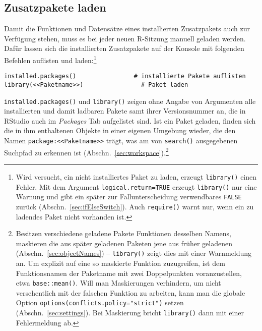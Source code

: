 \subsection{Zusatzpakete laden}
\label{sec:packages_library}

Damit die Funktionen und Datensätze eines installierten Zusatzpakets auch zur Verfügung stehen, muss es bei jeder neuen R-Sitzung manuell geladen werden. Dafür lassen sich die installierten Zusatzpakete auf der Konsole mit folgenden Befehlen auflisten und laden:\footnote{Wird versucht, ein nicht installiertes Paket zu laden, erzeugt \lstinline!library()! einen Fehler. Mit dem Argument \lstinline!logical.return=TRUE! erzeugt \lstinline!library()! nur eine Warnung und gibt ein später zur Fallunterscheidung verwendbares \lstinline!FALSE! zurück (Abschn.\ \ref{sec:ifElseSwitch}). Auch \lstinline!require()! warnt nur, wenn ein zu ladendes Paket nicht vorhanden ist.}


\begin{lstlisting}
installed.packages()                # installierte Pakete auflisten
library(<<Paketname>>)                # Paket laden
\end{lstlisting}

\lstinline!installed.packages()! und \lstinline!library()! zeigen ohne Angabe von Argumenten alle installierten und damit ladbaren Pakete samt ihrer Versionsnummer an, die in RStudio auch im \emph{Packages} Tab aufgelistet sind. Ist ein Paket geladen, finden sich die in ihm enthaltenen Objekte in einer eigenen Umgebung wieder, die den Namen \lstinline!package:<<Paketname>>! trägt, was am von \lstinline!search()! ausgegebenen Suchpfad zu erkennen ist (Abschn.\ \ref{sec:workspace}).\footnote{\label{ftn:envirFunc}Besitzen verschiedene geladene Pakete Funktionen desselben Namens, maskieren die aus später geladenen Paketen jene aus früher geladenen (Abschn.\ \ref{sec:objectNames}) -- \lstinline!library()! zeigt dies mit einer Warnmeldung an. Um explizit auf eine so maskierte Funktion zuzugreifen, ist dem Funktionsnamen der Paketname mit zwei Doppelpunkten voranzustellen, etwa \lstinline!base::mean()!. Will man Maskierungen verhindern, um nicht versehentlich mit der falschen Funktion zu arbeiten, kann man die globale Option \lstinline!options(conflicts.policy="strict")! setzen (Abschn.\ \ref{sec:settings}). Bei Maskierung bricht \lstinline!library()! dann mit einer Fehlermeldung ab.}

